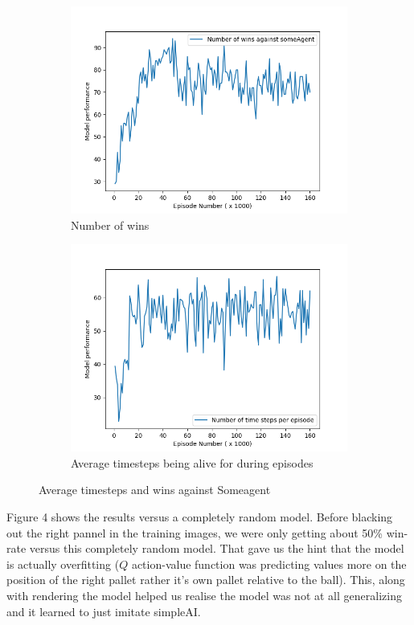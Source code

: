 \begin{figure}[ht!]
	\centering
	\begin{subfigure}{0.49\textwidth}
        \centering
        \includegraphics[scale=0.4]{figures/dqn_results_wins_vs_someagent.png}
        \caption{Number of wins}
        \label{fig:Number of wins}
    \end{subfigure}
    \begin{subfigure}{0.49\textwidth}
        \centering
        \includegraphics[scale=0.4]{figures/ttd_per_episode_vs_someagent.png}
        \caption{ Average timesteps being alive for during episodes}
        \label{fig: Average timesteps being alive for during episodes}
	\end{subfigure}    
    \caption{Average timesteps and wins against Someagent}
\end{figure}

\pagebreak

\medskip
\noindent
Figure 4 shows the results versus a completely random model. Before blacking out the right pannel in the training images, we were only getting about 50\% win-rate versus this completely random model. That gave us the hint that the model is actually overfitting ($Q$ action-value function was predicting values more on the position of the right pallet rather it's own pallet relative to the ball). This, along with rendering the model helped us realise the model was not at all generalizing and it learned to just imitate simpleAI.
